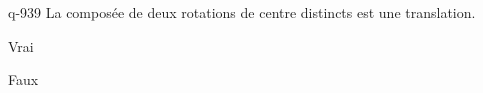 \begin{truefalse}{q-939}
La composée de deux rotations de centre distincts est une translation.
\item Vrai
\item* Faux
\end{truefalse}

